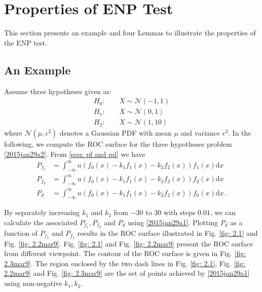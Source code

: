 
\section{Properties of ENP Test}
This section presents an example and four Lemmas to illustrate the properties of the ENP test. 
\subsection{An Example}
Assume three hypotheses given as:
\begin{equation}
  \label{2015jan29a2}
\begin{split}
H_0:\;\;\;\;&X \sim \mathcal{N}(-1, 1)\\
H_1:\;\;\;\;&X \sim \mathcal{N}(0, 1)\\
H_2:\;\;\;\;&X \sim \mathcal{N}(1, 10)
\end{split}
\end{equation}
where $\mathcal{N}(\mu, \epsilon^2)$ denotes a Gaussian PDF with mean $\mu$ and variance $\epsilon^2$. In the following, we compute the ROC surface for the three hypotheses problem \eqref{2015jan29a2}.  
From \eqref{equ: pf and pd} we have  
\begin{equation}
  \begin{split}
	P_{f_1} &= \int_{-\infty}^{\infty}u(f_0(x) - k_1f_1(x) -k_2f_2(x))f_1(x)\mathrm{d}x\\
	P_{f_2} &= \int_{-\infty}^{\infty}u(f_0(x) - k_1f_1(x) -k_2f_2(x))f_2(x)\mathrm{d}x\\
	P_d     &= \int_{-\infty}^{\infty}u(f_0(x) - k_1f_1(x) -k_2f_2(x))f_0(x)\mathrm{d}x\,.
  \end{split}
  \label{2015jan29a1}
\end{equation}

By separately increasing $k_1$ and $k_2$ from $-30$ to $30$ with steps $0.01$, we can calculate the associated $P_{f_1}, P_{f_2}$ and $P_d$ using \eqref{2015jan29a1}. 
Plotting $P_d$ as a function of $P_{f_1}$ and $P_{f_2}$ results in the ROC surface illustrated in Fig. \ref{fig: 2.1} and Fig. \ref{fig: 2.2mar9}. Fig. \ref{fig: 2.1} and Fig. \ref{fig: 2.2mar9} present the ROC surface from different viewpoint. The contour of the ROC surface is given in Fig. \ref{fig: 2.3mar9}. The region enclosed by the two dash lines in Fig. \ref{fig: 2.1}, Fig. \ref{fig: 2.2mar9} and Fig. \ref{fig: 2.3mar9} are the set of points 
achieved by \eqref{2015jan29a1} using non-negative $k_1, k_2$.

